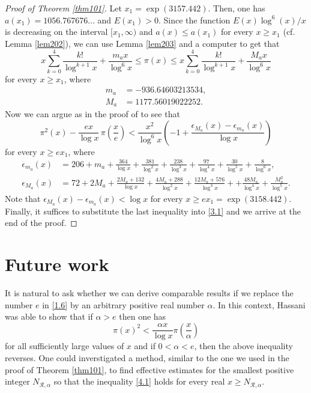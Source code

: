 \documentclass[a4paper,12pt]{amsart}
\theoremstyle{definition}
\theoremstyle{remark}
\begin{document}
\begin{proof}[Proof of Theorem \ref{thm101}]
Let $x_1 = \exp(3157.442)$. Then, one has $a(x_1) = 1056.767676\ldots$ and $E(x_1) > 0$. Since the function $E(x)\log^6(x)/x$ is decreasing on the interval $[x_1, \infty)$ and $a(x) \leq a(x_1)$ for every $x \geq x_1$ (cf. Lemma \ref{lem202}), we can use Lemma \ref{lem203} and a computer to get that
\begin{displaymath}
x\sum_{k=0}^4 \frac{k!}{\log^{k+1}x} + \frac{m_a x}{\log^6x} \leq \pi(x) \leq x\sum_{k=0}^4 \frac{k!}{\log^{k+1}x} + \frac{M_a x}{\log^6x}
\end{displaymath}
for every $x \geq x_1$, where
\begin{align*}
m_a &= -936.64603213534,\\
M_a &= 1177.56019022252.
\end{align*}
Now we can argue as in the proof of \cite[Lemma 2.1]{dudekplatt} to see that
\begin{equation}
\pi^2(x) - \frac{ex}{\log x}\, \pi \left( \frac{x}{e} \right) < \frac{x^2}{\log^6x} \left( -1 + \frac{\epsilon_{M_a}(x) - \epsilon_{m_a}(x)}{\log x} \right) \tag{3.1} \label{3.1}
\end{equation}
for every $x \geq ex_1$, where
\begin{align*}
\epsilon_{m_a}(x) &= 206 + m_a + \frac{364}{\log x} + \frac{381}{\log^2x} + \frac{238}{\log^3x} + \frac{97}{\log^4x} + \frac{30}{\log^5x} + \frac{8}{\log^6x}, \\
\epsilon_{M_a}(x) &= 72 + 2M_a + \frac{2M_a + 132}{\log x} + \frac{4M_a + 288}{\log^2 x} + \frac{12M_a + 576}{\log^3 x} + + \frac{48M_a}{\log^4 x} + \frac{M_a^2}{\log^5x}.
\end{align*}
Note that $\epsilon_{M_a}(x) - \epsilon_{m_a}(x) < \log x$ for every $x \geq ex_1 = \exp(3158.442)$. Finally, it suffices to substitute the last inequality into \eqref{3.1} and we arrive at the end of the proof.
\end{proof}

\section{Future work}
It is natural to ask whether we can derive comparable results if we replace the number $e$ in \eqref{1.6} by an arbitrary positive real number $\alpha$. In this context, Hassani \cite[Theorem 3]{hassani2} was able to show that if $\alpha > e$ then one has
\begin{displaymath}
\pi(x)^2 < \frac{\alpha x}{\log x} \pi \left( \frac{x}{\alpha} \right) \tag{4.1} \label{4.1}
\end{displaymath}
for all sufficiently large values of $x$ and if $0 < \alpha < e$, then the above inequality reverses. One could inverstigated a method, similar to the one we used in the proof of Theorem \ref{thm101}, to find effective estimates for the smallest positive integer $N_{\mathcal{R}, \alpha}$ so that the inequality \eqref{4.1} holds for every real $x \geq N_{\mathcal{R}, \alpha}$.
\end{document}
